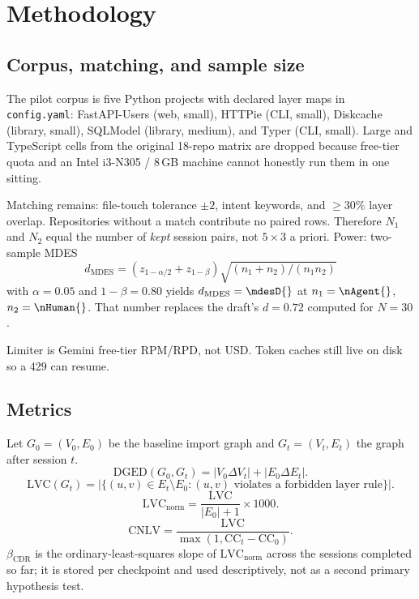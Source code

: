 \documentclass[11pt,letterpaper,logo]{yalearxiv}
\newcommand{\DGED}{\mathrm{DGED}}
\newcommand{\LVC}{\mathrm{LVC}}
\newcommand{\CNLV}{\mathrm{CNLV}}
\newcommand{\CDR}{\beta_{\mathrm{CDR}}}
\newcommand{\CC}{\mathrm{CC}}
\begin{document}
\section{Methodology}
\label{sec:methods}

\subsection{Corpus, matching, and sample size}
\label{sec:corpus}

The pilot corpus is five Python projects with declared layer maps in \texttt{config.yaml}: FastAPI-Users (web, small), HTTPie (CLI, small), Diskcache (library, small), SQLModel (library, medium), and Typer (CLI, small). Large and TypeScript cells from the original 18-repo matrix are dropped because free-tier quota and an Intel i3-N305 / 8\,GB machine cannot honestly run them in one sitting.

Matching remains: file-touch tolerance $\pm 2$, intent keywords, and $\ge 30\%$ layer overlap. Repositories without a match contribute no paired rows. Therefore $N_1$ and $N_2$ equal the number of \emph{kept} session pairs, not $5\times 3$ a priori. Power: two-sample MDES
\begin{equation}
d_{\mathrm{MDES}}=(z_{1-\alpha/2}+z_{1-\beta})\sqrt{(n_1+n_2)/(n_1 n_2)}
\label{eq:mdes}
\end{equation}
with $\alpha=0.05$ and $1-\beta=0.80$ yields $d_{\mathrm{MDES}}=\mdesD{}$ at $n_1=\nAgent{}$, $n_2=\nHuman{}$. That number replaces the draft's $d=0.72$ computed for $N=30$.

Limiter is Gemini free-tier RPM/RPD, not USD. Token caches still live on disk so a 429 can resume.

\subsection{Metrics}
\label{sec:metrics}

Let $G_0=(V_0,E_0)$ be the baseline import graph and $G_t=(V_t,E_t)$ the graph after session $t$.
\begin{equation}
\DGED(G_0,G_t)=|V_0\Delta V_t|+|E_0\Delta E_t|.
\label{eq:dged}
\end{equation}
\begin{equation}
\LVC(G_t)=\bigl|\{(u,v)\in E_t\setminus E_0:(u,v)\text{ violates a forbidden layer rule}\}\bigr|.
\label{eq:lvc}
\end{equation}
\begin{equation}
\LVC_{\mathrm{norm}}=\frac{\LVC}{|E_0|+1}\times 1000.
\label{eq:lvcnorm}
\end{equation}
\begin{equation}
\CNLV=\frac{\LVC}{\max(1,\CC_t-\CC_0)}.
\label{eq:cnlv}
\end{equation}
$\CDR$ is the ordinary-least-squares slope of $\LVC_{\mathrm{norm}}$ across the sessions completed so far; it is stored per checkpoint and used descriptively, not as a second primary hypothesis test.
\end{document}
